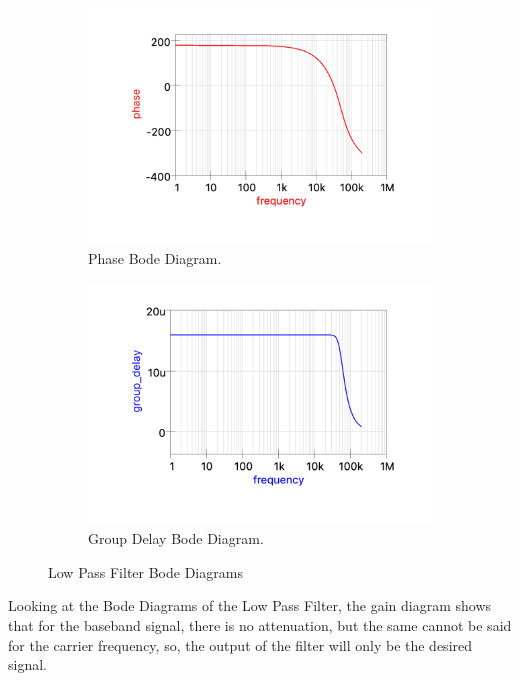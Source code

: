 \begin{figure}[H]
    \begin{subfigure}[b]{0.5\textwidth}
        \centering
        \includegraphics[width=\textwidth]{Images/Qucs_LPphase.png}
        \caption{Phase Bode Diagram.}
        \label{fig:Qucs_LPphase}
    \end{subfigure}%
    \begin{subfigure}[b]{0.5\textwidth}
        \centering
        \includegraphics[width=\textwidth]{Images/Qucs_LPgd.png}
        \caption{Group Delay Bode Diagram.}
        \label{fig:Qucs_LPgd}
    \end{subfigure}

    \caption{Low Pass Filter Bode Diagrams}
    \label{fig:Qucs_LPBode}
\end{figure}

Looking at the Bode Diagrams of the Low Pass Filter, the gain diagram shows that for the baseband signal, there is no attenuation, but the same cannot be said for the carrier frequency, so, the output of the filter will only be the desired signal.

